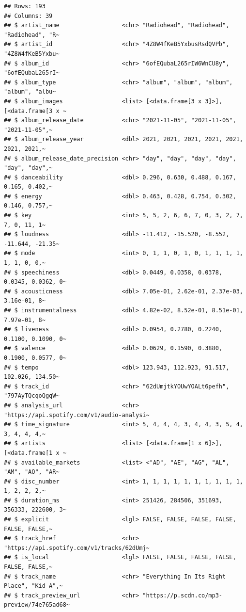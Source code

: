 \documentclass[
]{book}
\begin{document}
\begin{verbatim}
## Rows: 193
## Columns: 39
## $ artist_name                  <chr> "Radiohead", "Radiohead", "Radiohead", "R~
## $ artist_id                    <chr> "4Z8W4fKeB5YxbusRsdQVPb", "4Z8W4fKeB5Yxbu~
## $ album_id                     <chr> "6ofEQubaL265rIW6WnCU8y", "6ofEQubaL265rI~
## $ album_type                   <chr> "album", "album", "album", "album", "albu~
## $ album_images                 <list> [<data.frame[3 x 3]>], [<data.frame[3 x ~
## $ album_release_date           <chr> "2021-11-05", "2021-11-05", "2021-11-05",~
## $ album_release_year           <dbl> 2021, 2021, 2021, 2021, 2021, 2021, 2021,~
## $ album_release_date_precision <chr> "day", "day", "day", "day", "day", "day",~
## $ danceability                 <dbl> 0.296, 0.630, 0.488, 0.167, 0.165, 0.402,~
## $ energy                       <dbl> 0.463, 0.428, 0.754, 0.302, 0.146, 0.757,~
## $ key                          <int> 5, 5, 2, 6, 6, 7, 0, 3, 2, 7, 7, 0, 11, 1~
## $ loudness                     <dbl> -11.412, -15.520, -8.552, -11.644, -21.35~
## $ mode                         <int> 0, 1, 1, 0, 1, 0, 1, 1, 1, 1, 1, 1, 0, 0,~
## $ speechiness                  <dbl> 0.0449, 0.0358, 0.0378, 0.0345, 0.0362, 0~
## $ acousticness                 <dbl> 7.05e-01, 2.62e-01, 2.37e-03, 3.16e-01, 8~
## $ instrumentalness             <dbl> 4.82e-02, 8.52e-01, 8.51e-01, 7.97e-01, 8~
## $ liveness                     <dbl> 0.0954, 0.2780, 0.2240, 0.1100, 0.1090, 0~
## $ valence                      <dbl> 0.0629, 0.1590, 0.3880, 0.1900, 0.0577, 0~
## $ tempo                        <dbl> 123.943, 112.923, 91.517, 102.026, 134.50~
## $ track_id                     <chr> "62dUmjtkYOUwYOALt6pefh", "797AyTQcqoQgqW~
## $ analysis_url                 <chr> "https://api.spotify.com/v1/audio-analysi~
## $ time_signature               <int> 5, 4, 4, 4, 3, 4, 4, 3, 5, 4, 3, 4, 4, 4,~
## $ artists                      <list> [<data.frame[1 x 6]>], [<data.frame[1 x ~
## $ available_markets            <list> <"AD", "AE", "AG", "AL", "AM", "AO", "AR~
## $ disc_number                  <int> 1, 1, 1, 1, 1, 1, 1, 1, 1, 1, 1, 2, 2, 2,~
## $ duration_ms                  <int> 251426, 284506, 351693, 356333, 222600, 3~
## $ explicit                     <lgl> FALSE, FALSE, FALSE, FALSE, FALSE, FALSE,~
## $ track_href                   <chr> "https://api.spotify.com/v1/tracks/62dUmj~
## $ is_local                     <lgl> FALSE, FALSE, FALSE, FALSE, FALSE, FALSE,~
## $ track_name                   <chr> "Everything In Its Right Place", "Kid A",~
## $ track_preview_url            <chr> "https://p.scdn.co/mp3-preview/74e765ad68~

\end{verbatim}
\end{document}
